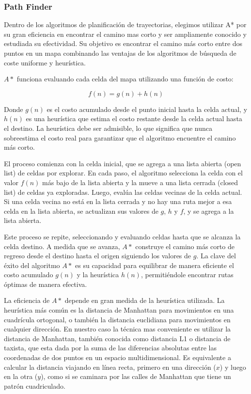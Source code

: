 \subsubsection{Path Finder}

Dentro de los algoritmos de planificación de trayectorias, elegimos utilizar A* por su gran eficiencia en encontrar el camino mas corto y ser ampliamente conocido y estudiada su efectividad. Su objetivo es encontrar el camino más corto entre dos puntos en un mapa combinando las ventajas de los algoritmos de búsqueda de coste uniforme y heurística. \cite{sariffpathplan} \cite{cuevaspathfinding}

$A*$ funciona evaluando cada celda del mapa utilizando una función de costo:

$$ f(n) = g(n) + h(n) $$

Donde $g(n)$ es el costo acumulado desde el punto inicial hasta la celda actual, y $h(n)$ es una heurística que estima el costo restante desde la celda actual hasta el destino. La heurística debe ser admisible, lo que significa que nunca sobreestima el costo real para garantizar que el algoritmo encuentre el camino más corto.

El proceso comienza con la celda inicial, que se agrega a una lista abierta (open list) de celdas por explorar. En cada paso, el algoritmo selecciona la celda con el valor $f(n)$ más bajo de la lista abierta y la mueve a una lista cerrada (closed list) de celdas ya exploradas. Luego, evalúa las celdas vecinas de la celda actual. Si una celda vecina no está en la lista cerrada y no hay una ruta mejor a esa celda en la lista abierta, se actualizan sus valores de $g$, $h$ y $f$, y se agrega a la lista abierta.

Este proceso se repite, seleccionando y evaluando celdas hasta que se alcanza la celda destino. A medida que se avanza, $A*$ construye el camino más corto de regreso desde el destino hasta el origen siguiendo los valores de $g$. La clave del éxito del algoritmo $A*$ es su capacidad para equilibrar de manera eficiente el costo acumulado $g(n)$ y la heurística $h(n)$, permitiéndole encontrar rutas óptimas de manera efectiva.

La eficiencia de $A*$ depende en gran medida de la heurística utilizada. La heurística más común es la distancia de Manhattan para movimientos en una cuadrícula ortogonal, o también la distancia euclidiana para movimientos en cualquier dirección. En nuestro caso la técnica mas conveniente es utilizar la distancia de Manhattan, también conocida como distancia L1 o distancia de taxista, que esta dada por la suma de las diferencias absolutas entre las coordenadas de dos puntos en un espacio multidimensional. Es equivalente a calcular la distancia viajando en línea recta, primero en una dirección ($x$) y luego en la otra ($y$), como si se caminara por las calles de Manhattan que tiene un patrón cuadriculado.

